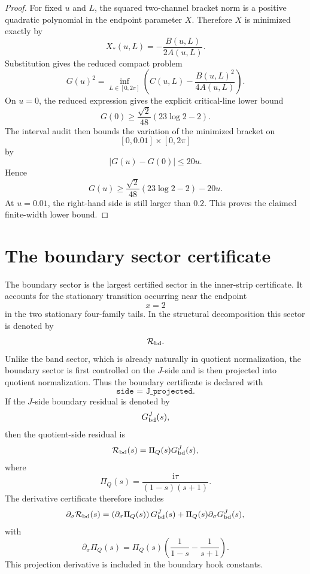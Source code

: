 \documentclass[11pt]{article}
\newcommand{\ii}{\mathrm{i}}
\newcommand{\s}{s}
\newcommand{\sig}{\sigma}
\newcommand{\tauh}{\tau}
\newcommand{\Rbd}{\mathcal R_{\rm bd}}
\newcommand{\Gbd}{G_{\rm bd}^{J}}
\newcommand{\PiQ}{\Pi_Q}
\newcommand{\JSON}[1]{\texttt{#1}}
\begin{document}
\begin{proof}
For fixed \(u\) and \(L\), the squared two-channel bracket norm is a positive
quadratic polynomial in the endpoint parameter \(X\).  Therefore \(X\) is
minimized exactly by
\[
        X_*(u,L)
        =
        -\frac{B(u,L)}{2A(u,L)}.
\]
Substitution gives the reduced compact problem
\[
        G(u)^2
        =
        \inf_{L\in[0,2\pi]}
        \left(
            C(u,L)
            -
            \frac{B(u,L)^2}{4A(u,L)}
        \right).
\]
On \(u=0\), the reduced expression gives the explicit critical-line lower
bound
\[
        G(0)
        \ge
        \frac{\sqrt2}{48}(23\log2-2).
\]
The interval audit then bounds the variation of the minimized bracket on
\[
        [0,0.01]\times[0,2\pi]
\]
by
\[
        |G(u)-G(0)|\le20u.
\]
Hence
\[
        G(u)
        \ge
        \frac{\sqrt2}{48}(23\log2-2)-20u.
\]
At \(u=0.01\), the right-hand side is still larger than \(0.2\).  This proves
the claimed finite-width lower bound.
\end{proof}


\section{The boundary sector certificate}

The boundary sector is the largest certified sector in the inner-strip
certificate.  It accounts for the stationary transition occurring near the
endpoint
\[
        x=2
\]
in the two stationary four-family tails.  In the structural decomposition this
sector is denoted by
\[
        \Rbd .
\]
Unlike the band sector, which is already naturally in quotient normalization,
the boundary sector is first controlled on the \(J\)-side and is then projected
into quotient normalization.  Thus the boundary certificate is declared with
\[
        \JSON{side = J\_projected}.
\]
If the \(J\)-side boundary residual is denoted by
\[
        \Gbd(\s),
\]
then the quotient-side residual is
\[
        \Rbd(\s)
        =
        \PiQ(\s)\Gbd(\s),
\]
where
\[
        \PiQ(\s)
        =
        \frac{\ii\tauh}{(1-\s)(\s+1)}.
\]
The derivative certificate therefore includes
\[
        \partial_\sig \Rbd(\s)
        =
        \left(\partial_\sig\PiQ(\s)\right)\Gbd(\s)
        +
        \PiQ(\s)\partial_\sig \Gbd(\s),
\]
with
\[
        \partial_\sig\PiQ(\s)
        =
        \PiQ(\s)
        \left(
            \frac{1}{1-\s}
            -
            \frac{1}{\s+1}
        \right).
\]
This projection derivative is included in the boundary hook constants.
\end{document}
